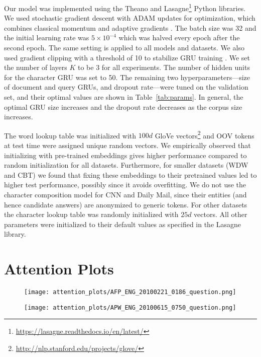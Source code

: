 \documentclass[11pt,a4paper]{article}
\begin{document}
Our model was implemented using the Theano \citep{2016arXiv160502688short} and Lasagne\footnote{\scriptsize \url{https://lasagne.readthedocs.io/en/latest/}} Python libraries. We used stochastic gradient descent with ADAM updates for optimization, which combines classical momentum and adaptive gradients \citep{kingma2014adam}. The batch size was 32 and the initial learning rate was $5\times 10^{-4}$ which was halved every epoch after the second epoch.
The same setting is applied to all models and datasets. We also used gradient clipping with a threshold of 10 to stabilize GRU training \citep{pascanu2012difficulty}.
We set the number of layers $K$ to be $3$ for all experiments.
The number of hidden units for the character GRU was set to 50.
The remaining two hyperparameters---size of document and query GRUs, and dropout rate---were tuned on the validation set, and their optimal values are shown in Table~\ref{tab:params}. In general, the optimal GRU size increases and the dropout rate decreases as the corpus size increases.

The word lookup table was initialized with $100d$ GloVe vectors\footnote{\scriptsize \url{http://nlp.stanford.edu/projects/glove/}} \citep{pennington2014glove} and OOV tokens at test time were assigned unique random vectors. We empirically observed that initializing with pre-trained embeddings gives higher performance compared to random initialization for all datasets. Furthermore, for smaller datasets (WDW and CBT) we found that fixing these embeddings to their pretrained values led to higher test performance, possibly since it avoids overfitting. We do not use the character composition model for CNN and Daily Mail, since their entities (and hence candidate answers) are anonymized to generic tokens. For other datasets the character lookup table was randomly initialized with $25d$ vectors. All other parameters were initialized to their default values as specified in the Lasagne library.


\section{Attention Plots}
\begin{figure*}[h]
\centering
\caption{Layer-wise attention visualization of GA Reader trained on WDW-Strict. See text for details.}
\begin{subfigure}[b]{\textwidth}
\centering
\texttt{[image: attention\_plots/AFP\_ENG\_20100221\_0186\_question.png]}
\end{subfigure}
\begin{subfigure}[b]{\textwidth}
\centering
\texttt{[image: attention\_plots/APW\_ENG\_20100615\_0750\_question.png]}
\end{subfigure}
\end{figure*}
\end{document}
